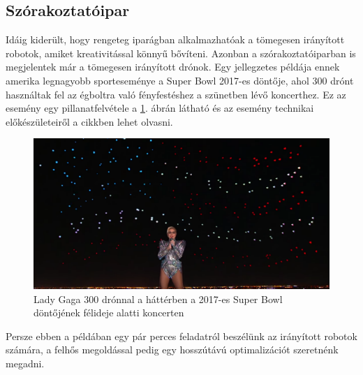 \subsection{Szórakoztatóipar}
Idáig kiderült, hogy rengeteg iparágban alkalmazhatóak a tömegesen irányított robotok, amiket kreativitással könnyű bővíteni. Azonban a szórakoztatóiparban is megjelentek már a tömegesen irányított drónok. Egy jellegzetes példája ennek amerika legnagyobb sporteseménye a Super Bowl 2017-es döntője, ahol 300 drónt használtak fel az égboltra való fényfestéshez a szünetben lévő koncerthez. Ez az esemény egy pillanatfelvétele a \ref{fig:super-bowl}. ábrán látható és az esemény technikai előkészületeiről a \cite{concert} cikkben lehet olvasni.
\begin{figure}
	\centering
	\includegraphics[width=12cm]{figures/super_bowl.png}
	\caption{Lady Gaga 300 drónnal a háttérben a 2017-es Super Bowl döntőjének félideje alatti koncerten \cite{super-bowl-pic}}
	\label{fig:super-bowl}
\end{figure}
Persze ebben a példában egy pár perces feladatról beszélünk az irányított robotok számára, a felhős megoldással pedig egy hosszútávú optimalizációt szeretnénk megadni.

